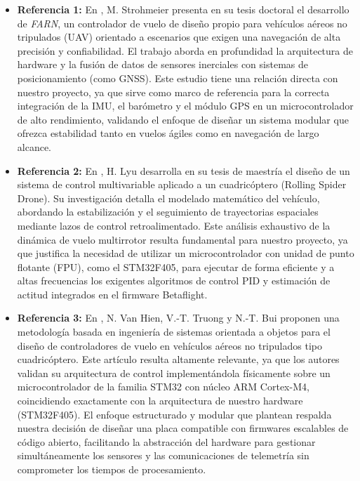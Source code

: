 \documentclass[12pt, letterpaper]{report}
\begin{document}
\begin{itemize}
    \item \textbf{Referencia 1:} En \cite{ref1}, M. Strohmeier presenta en su tesis doctoral el desarrollo de \textit{FARN}, un controlador de vuelo de diseño propio para vehículos aéreos no tripulados (UAV) orientado a escenarios que exigen una navegación de alta precisión y confiabilidad. El trabajo aborda en profundidad la arquitectura de hardware y la fusión de datos de sensores inerciales con sistemas de posicionamiento (como GNSS). Este estudio tiene una relación directa con nuestro proyecto, ya que sirve como marco de referencia para la correcta integración de la IMU, el barómetro y el módulo GPS en un microcontrolador de alto rendimiento, validando el enfoque de diseñar un sistema modular que ofrezca estabilidad tanto en vuelos ágiles como en navegación de largo alcance.

    \item \textbf{Referencia 2:} En \cite{ref2}, H. Lyu desarrolla en su tesis de maestría el diseño de un sistema de control multivariable aplicado a un cuadricóptero (Rolling Spider Drone). Su investigación detalla el modelado matemático del vehículo, abordando la estabilización y el seguimiento de trayectorias espaciales mediante lazos de control retroalimentado. Este análisis exhaustivo de la dinámica de vuelo multirrotor resulta fundamental para nuestro proyecto, ya que justifica la necesidad de utilizar un microcontrolador con unidad de punto flotante (FPU), como el STM32F405, para ejecutar de forma eficiente y a altas frecuencias los exigentes algoritmos de control PID y estimación de actitud integrados en el firmware Betaflight.

    \item \textbf{Referencia 3:} En \cite{ref3}, N. Van Hien, V.-T. Truong y N.-T. Bui proponen una metodología basada en ingeniería de sistemas orientada a objetos para el diseño de controladores de vuelo en vehículos aéreos no tripulados tipo cuadricóptero. Este artículo resulta altamente relevante, ya que los autores validan su arquitectura de control implementándola físicamente sobre un microcontrolador de la familia STM32 con núcleo ARM Cortex-M4, coincidiendo exactamente con la arquitectura de nuestro hardware (STM32F405). El enfoque estructurado y modular que plantean respalda nuestra decisión de diseñar una placa compatible con firmwares escalables de código abierto, facilitando la abstracción del hardware para gestionar simultáneamente los sensores y las comunicaciones de telemetría sin comprometer los tiempos de procesamiento.


\end{itemize}
\end{document}
